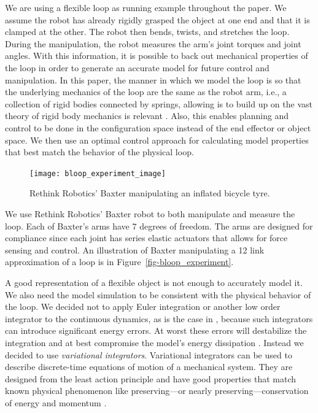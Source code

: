 \documentclass[letterpaper, 10pt, conference]{ieeeconf}
\begin{document}
We are using a flexible loop as running example throughout the paper.  We assume the robot has already rigidly grasped the object at one end and that it is clamped at the other.  The robot then bends, twists, and stretches the loop.  During the manipulation, the robot measures the arm's joint torques and joint angles.  With this information, it is possible to back out mechanical properties of the loop in order to generate an accurate model for future control and manipulation.  In this paper, the manner in which we model the loop is so that the underlying mechanics of the loop are the same as the robot arm, i.e., a collection of rigid bodies connected by springs, allowing is to build up on 
the vast theory of rigid body mechanics is relevant \cite{murray_li_sastry}. Also,  this enables planning and control to be done in the configuration space instead of the end effector or object space.  We then use an optimal control approach for calculating model properties that best match the behavior of the physical loop.



\begin{figure}
\centering
\texttt{[image: bloop\_experiment\_image]}
\caption{Rethink Robotics' Baxter manipulating an inflated bicycle tyre.}
\label{fig-baxter_image_1}
\end{figure}

We use Rethink Robotics' Baxter \cite{guizzo2011rethink} robot to both manipulate and measure the loop.  Each of Baxter's arms have 7 degrees of freedom.  The arms are designed for compliance since each joint has series elastic actuators that allows for force sensing and control.  An illustration of Baxter manipulating a 12 link approximation of a loop is in Figure~\ref{fig-bloop_experiment}.

A good representation of a flexible object is not enough to accurately model it.  We also need the model simulation to be consistent with the physical behavior of the loop.  We decided not to apply Euler integration or another low order integrator to the continuous dynamics, as is the case in \cite{sahari_etal}, because such integrators can introduce significant energy errors.  At worst these errors will destabilize the integration and at best compromise the model's energy dissipation \cite{johnson_murphey_scalable}.  Instead we decided to use \emph{variational integrators}.  Variational integrators can be used to describe discrete-time equations of motion of a mechanical system.  They are designed from the least action principle and have good properties that match known physical phenomenon like preserving---or nearly preserving---conservation of energy and momentum \cite{johnson_murphey_scalable, marsden_west}.
\end{document}
